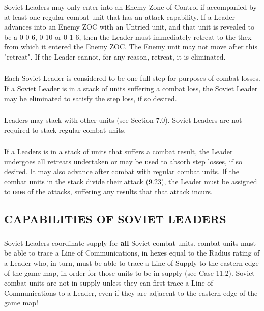 \subsubsection{} Soviet Leaders may only enter into an Enemy Zone of Control if accompanied by at least one regular combat unit that has an attack capability. If a Leader advances into an Enemy ZOC with an Untried unit, and that unit is revealed to be a 0-0-6, 0-10 or 0-1-6, then the Leader must immediately retreat to the thex from which it entered the Enemy ZOC. The Enemy unit may not move after this "retreat". If the Leader cannot, for any reason, retreat, it is eliminated.

\subsubsection{} Each Soviet Leader is considered to be one full step for purposes of combat losses. If a Soviet Leader is in a stack of units suffering a combat loss, the Soviet Leader may be eliminated to satisfy the step loss, if so desired.

\subsubsection{} Leaders may stack with other units (see Section 7.0). Soviet Leaders are not required to stack regular combat units.

\subsubsection{} If a Leaders is in a stack of units that suffers a combat result, the Leader undergoes all retreats undertaken or may be used to absorb step losses, if so desired. It may also advance after combat with regular combat units. If the combat units in the stack divide their attack (9.23), the Leader must be assigned to \textbf{one} of the attacks, suffering any results that that attack incurs.

\begin{flushleft}
  \subsection{CAPABILITIES OF SOVIET LEADERS}
\end{flushleft}

\subsubsection{} Soviet Leaders coordinate supply for \textbf{all} Soviet combat units. combat units must be able to trace a Line of Communications, in hexes equal to the Radius rating of a Leader who, in turn, must be able to trace a Line of Supply to the eastern edge of the game map, in order for those units to be in supply (see Case 11.2). Soviet combat units are not in supply unless they can first trace a Line of Communications to a Leader, even if they are adjacent to the eastern edge of the game map!

